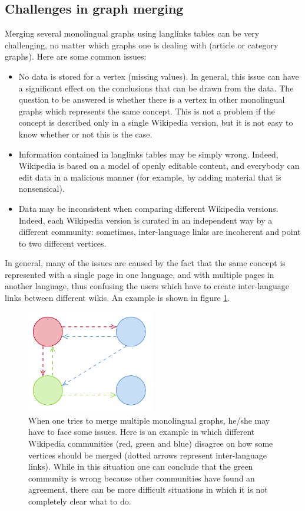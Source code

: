         \subsection{Challenges in graph merging}\label{challenges_merging}
            Merging several monolingual graphs using langlinks tables can be very challenging, no matter which graphs one is dealing with (article or category graphs). Here are some common issues:
            \begin{itemize}
                \item No data is stored for a vertex (missing values). In general, this issue can have a significant effect on the conclusions that can be drawn from the data. The question to be answered is whether there is a vertex in other monolingual graphs which represents the same concept. This is not a problem if the concept is described only in a single Wikipedia version, but it is not easy to know whether or not this is the case.
                \item Information contained in langlinks tables may be simply wrong. Indeed, Wikipedia is based on a model of openly editable content, and everybody can edit data in a malicious manner (for example, by adding material that is nonsensical).
                \item Data may be inconsistent when comparing different Wikipedia versions. Indeed, each Wikipedia version is curated in an independent way by a different community: sometimes, inter-language links are incoherent and point to two different vertices.
            \end{itemize}
            In general, many of the issues are caused by the fact that the same concept is represented with a single page in one language, and with multiple pages in another language, thus confusing the users which have to create inter-language links between different wikis. An example is shown in figure \ref{langlinks_problems}.
            
            \begin{figure}
                \centering
                \includegraphics[width=0.5\textwidth]{images/langlinks_problems.pdf}
                \caption{When one tries to merge multiple monolingual graphs, he/she may have to face some issues. Here is an example in which different Wikipedia communities (red, green and blue) disagree on how some vertices should be merged (dotted arrows represent inter-language links). While in this situation one can conclude that the green community is wrong because other communities have found an agreement, there can be more difficult situations in which it is not completely clear what to do.}
                \label{langlinks_problems}
            \end{figure}
